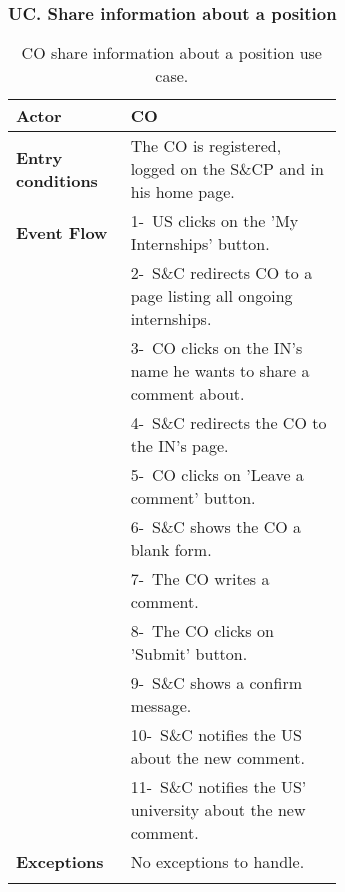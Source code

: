 \subsubsection*{UC\cuc . Share information about a position}
\begin{center}
    \begin{longtable}{|l|p{0.65\linewidth}|}
        \hline
        \textbf{Actor}            & CO \\
        \hline
        \hline
        \textbf{Entry conditions} & The CO is registered, logged on the S\&CP and in his home page. \\
        \hline
        \textbf{Event Flow}       & 1-\ US clicks on the 'My Internships' button.  \\
        & 2-\ S\&C redirects CO to a page listing all ongoing internships.\\
        & 3-\ CO clicks on the IN's name he wants to share a comment about. \\
        & 4-\ S\&C redirects the CO to the IN's page. \\
        & 5-\ CO clicks on 'Leave a comment' button. \\
        & 6-\ S\&C shows the CO a blank form.\\
        & 7-\ The CO writes a comment. \\
        & 8-\ The CO clicks on 'Submit' button.  \\
        & 9-\ S\&C shows a confirm message.\\
        & 10-\ S\&C notifies the US about the new comment.\\
        & 11-\ S\&C notifies the US' university about the new comment.\\
        \hline
        \textbf{Exceptions}       & No exceptions to handle. \\
        \hline
        \caption{CO share information about a position use case.}
        \label{tab: cp_use_case}
    \end{longtable}
\end{center}

